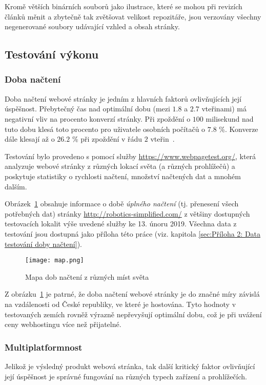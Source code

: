 \documentclass[a4paper, 12pt]{article}
\begin{document}
  Kromě větších binárních souborů jako ilustrace, které se mohou při revizích článků měnit a zbytečně tak zvětšovat velikost repozitáře, jsou verzovány všechny negenerované soubory udávající vzhled a obsah stránky.


  \subsection{Testování výkonu}


  \subsubsection{Doba načtení}
  Doba načtení webové stránky je jedním z hlavních faktorů ovlivňujících její úspěšnost. Přebytečný čas nad optimální dobu (mezi $1.8$ a $2.7$ vteřinami) má negativní vliv na procento konverzí stránky. Při zpoždění o $100$ milisekund nad tuto dobu klesá toto procento pro uživatele osobních počítačů o $7.8$ \%. Konverze dále klesají až o $26.2$ \% při zpoždění v řádu $2$ vteřin~\cite{conversion-rate-statistics}.

  Testování bylo provedeno s pomocí služby \url{https://www.webpagetest.org/}, která analyzuje webové stránky z různých lokací světa (a různých prohlížečů) a poskytuje statistiky o rychlosti načtení, množství načtených dat a mnohém dalším.

  Obrázek~\ref{img:Mapa dob načtení z různých lokací světa} obsahuje informace o době \emph{úplného načtení} (tj. přenesení všech potřebných dat) stránky \url{http://robotics-simplified.com/} z většiny dostupných testovacích lokalit výše uvedené služby ke 13. únoru 2019. Všechna data z testování jsou dostupná jako příloha této práce (viz. kapitola \ref{sec:Příloha 2: Data testování doby načtení}).

  \begin{figure}[H]
    \texttt{[image: map.png]}
    \caption{Mapa dob načtení z různých míst světa} \label{img:Mapa dob načtení z různých lokací světa}
  \end{figure}

  Z obrázku~\ref{img:Mapa dob načtení z různých lokací světa} je patrné, že doba načtení webové stránky je do značné míry závislá na vzdálenosti od České republiky, ve které je hostována. Tyto hodnoty v testovaných zemích rovněž výrazně nepřevyšují optimální dobu, což je při uvážení ceny webhostingu více než přijatelné.


  \subsubsection{Multiplatformnost}
  Jelikož je výsledný produkt webová stránka, tak další kritický faktor ovlivňující její úspěšnost je správné fungování na různých typech zařízení a prohlížečích.
\end{document}
